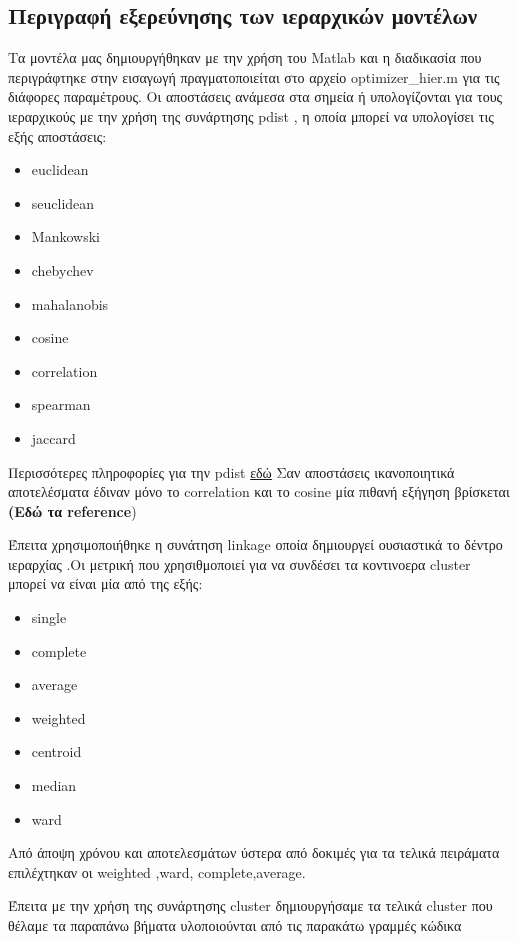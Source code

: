 \subsection{Περιγραφή εξερεύνησης των ιεραρχικών μοντέλων}

Τα μοντέλα μας δημιουργήθηκαν με την χρήση του Matlab και η διαδικασία που περιγράφτηκε στην εισαγωγή πραγματοποιείται στο αρχείο optimizer\_hier.m
για τις διάφορες παραμέτρους. Οι αποστάσεις ανάμεσα στα σημεία ή υπολογίζονται για τους ιεραρχικούς με την χρήση της συνάρτησης pdist , η οποία μπορεί να υπολογίσει τις εξής αποστάσεις:
\begin{itemize}
	\item euclidean
	\item seuclidean
	\item Mankowski
	\item chebychev
	\item mahalanobis
	\item cosine
	\item correlation
	\item spearman
	\item jaccard 
\end{itemize}


Περισσότερες πληροφορίες για την pdist \href{http://www.mathworks.com/help/stats/pdist.html}{εδώ}
Σαν αποστάσεις ικανοποιητικά αποτελέσματα έδιναν μόνο το correlation και το 
cosine  μία πιθανή εξήγηση βρίσκεται \textbf{(Εδώ τα reference})

Έπειτα χρησιμοποιήθηκε η συνάτηση linkage οποία δημιουργεί ουσιαστικά το δέντρο ιεραρχίας .Οι μετρική που χρησιθμοποιεί για να συνδέσει τα κοντινοερα cluster μπορεί να είναι μία από της εξής:
\begin{itemize}
  	\item single
  	\item complete
  	\item average
  	\item weighted
  	\item centroid
  	\item median
  	\item ward 
  \end{itemize}

Από άποψη χρόνου και αποτελεσμάτων ύστερα από δοκιμές για τα τελικά πειράματα επιλέχτηκαν οι weighted ,ward, complete,average.

Έπειτα με την χρήση της συνάρτησης cluster δημιουργήσαμε τα τελικά cluster που θέλαμε τα παραπάνω βήματα υλοποιούνται από τις παρακάτω γραμμές κώδικα 



